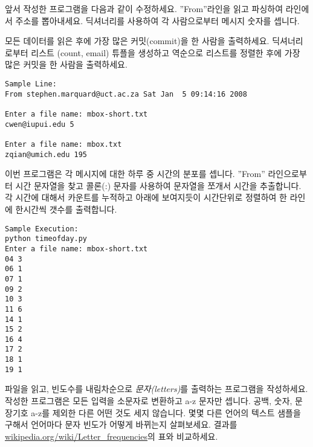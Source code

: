 \begin{ex}
앞서 작성한 프로그램을 다음과 같이 수정하세요.
''From''라인을 읽고 파싱하여 라인에서 주소를 뽑아내세요.
딕셔너리를 사용하여 각 사람으로부터 메시지 숫자를 셉니다.

모든 데이터를 읽은 후에 가장 많은 커밋(commit)을 한 사람을 출력하세요.
딕셔너리로부터 리스트 (count, email) 튜플을 생성하고 역순으로 리스트를 정렬한 후에 가장 많은 커밋을 한 사람을 출력하세요.

\beforeverb
\begin{verbatim}
Sample Line:
From stephen.marquard@uct.ac.za Sat Jan  5 09:14:16 2008

Enter a file name: mbox-short.txt
cwen@iupui.edu 5

Enter a file name: mbox.txt
zqian@umich.edu 195
\end{verbatim}
\afterverb
\end{ex}
\begin{ex}

이번 프로그램은 각 메시지에 대한 하루 중 시간의 분포를 셉니다.
''From'' 라인으로부터 시간 문자열을 찾고 콜론(:) 문자를 사용하여 문자열을 쪼개서 시간을 추출합니다.
각 시간에 대해서 카운트를 누적하고 아래에 보여지듯이 시간단위로 정렬하여 한 라인에 한시간씩 갯수를 출력합니다.

\beforeverb
\begin{verbatim}
Sample Execution:
python timeofday.py
Enter a file name: mbox-short.txt
04 3
06 1
07 1
09 2
10 3
11 6
14 1
15 2
16 4
17 2
18 1
19 1
\end{verbatim}
\afterverb
\end{ex}


\begin{ex}
파일을 읽고, 빈도수를 내림차순으로 {\em 문자(letters)}를 출력하는 프로그램을 작성하세요.
작성한 프로그램은 모든 입력을 소문자로 변환하고 a-z 문자만 셉니다. 
공백, 숫자, 문장기호 a-z를 제외한 다른 어떤 것도 세지 않습니다.
몇몇 다른 언어의 텍스트 샘플을 구해서 언어마다 문자 빈도가 어떻게 바뀌는지 살펴보세요.
결과를 \url{wikipedia.org/wiki/Letter_frequencies}의 표와 비교하세요.


\end{ex}


